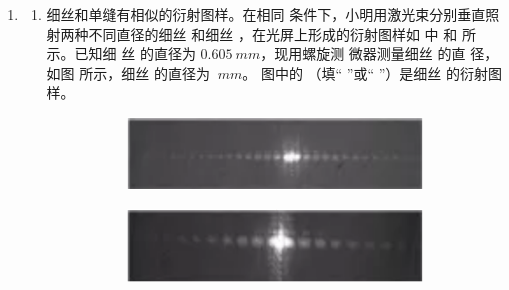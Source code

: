 \begin{enumerate}
\item 
{}
\begin{enumerate}
	\item
细丝和单缝有相似的衍射图样。在相同
条件下，小明用激光束分别垂直照射两种不同直径的细丝  和细丝  ，在光屏上形成的衍射图样如
中  和  所示。已知细
丝  的直径为
$ 0.605 \ mm $，现用螺旋测
微器测量细丝  的直
径，如图  所示，细丝  
的直径为 \underlinegap 
$  \ mm $。
图中的  \underlinegap  （填“  ”或“  ”）是细丝  的衍射图样。
\begin{figure}[h!]
	\centering
	\begin{subfigure}{0.4\linewidth}
		\centering
	\includegraphics[width=0.7\linewidth]{picture/screenshot074}
		\caption{}\label{2018浙江4月21a}
	\end{subfigure}
	\begin{subfigure}{0.4\linewidth}
		\centering
	\includegraphics[width=0.7\linewidth]{picture/screenshot075}
		\caption{}\label{2018浙江4月21b}
	\end{subfigure}
	\begin{subfigure}{0.8\linewidth}
		\centering
		
		\caption{}\label{2018浙江4月21c}
	\end{subfigure}
\end{figure}



\end{enumerate}
\end{enumerate}
